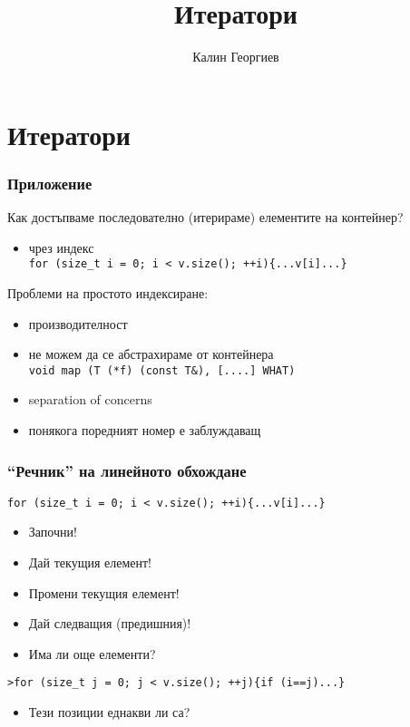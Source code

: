 \documentclass{beamer}
\begin{document}
\title[Обектно-ориентирано програмиране]{Итератори} 
\author{Калин Георгиев} 
\frame{\titlepage} 


\section{Итератори} 


\begin{frame}[fragile]
  \frametitle{Приложение}

  Как достъпваме последователно (итерираме) елементите на контейнер?
  \begin{itemize}
    \item чрез индекс \\
          \verb#for (size_t i = 0; i < v.size(); ++i){...v[i]...}#
  \end{itemize}
  Проблеми на простото индексиране:
  \begin{itemize}
    \item производителност
    \item не можем да се абстрахираме от контейнера\\
    \verb#void map (T (*f) (const T&), [....] WHAT)#
    \item separation of concerns
    \item понякога поредният номер е заблуждаващ
  \end{itemize}
  
  
  \end{frame}

  
  \begin{frame}[fragile]
    \frametitle{``Речник'' на линейното обхождане}
  
    \verb#for (size_t i = 0; i < v.size(); ++i){...v[i]...}#

    \begin{itemize}
      \item Започни!
      \item Дай текущия елемент!
      \item Промени текущия елемент!
      \item Дай следващия (предишния)!
      \item Има ли още елементи?
    \end{itemize}
    \verb#>for (size_t j = 0; j < v.size(); ++j){if (i==j)...}#   
    \begin{itemize}
      \item Тези позиции еднакви ли са?
    \end{itemize}
  \end{frame}
  
\end{document}

